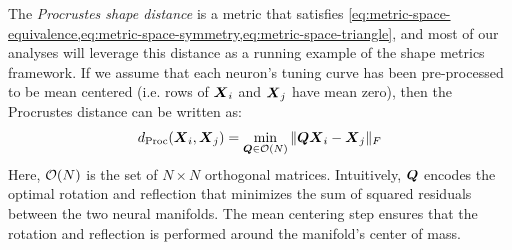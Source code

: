 The \textit{Procrustes shape distance} \parencite{schonemann1966generalized} is a metric that satisfies \cref{eq:metric-space-equivalence,eq:metric-space-symmetry,eq:metric-space-triangle}, and most of our analyses will leverage this distance as a running example of the shape metrics framework.
If we assume that each neuron's tuning curve has been pre-processed to be mean centered (i.e. rows of $\boldsymbol{X}_i$ and $\boldsymbol{X}_j$ have mean zero), then the Procrustes distance can be written as:
\begin{equation}
\label{eq:procrustes-distance}
d_{\text{Proc}}(\boldsymbol{X}_i, \boldsymbol{X}_j) = \min_{\boldsymbol{Q} \in \mathcal{O}(N)} \Vert \boldsymbol{Q} \boldsymbol{X}_i - \boldsymbol{X}_j \Vert_F
\end{equation}
Here, $\mathcal{O}(N)$ is the set of $N \times N$ orthogonal matrices.
Intuitively, $\boldsymbol{Q}$ encodes the optimal rotation and reflection that minimizes the sum of squared residuals between the two neural manifolds.
The mean centering step ensures that the rotation and reflection is performed around the manifold's center of mass.



